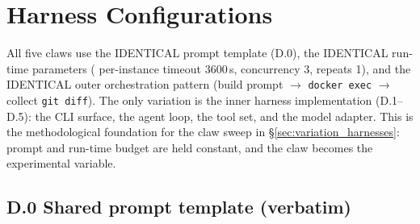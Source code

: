 \section{Harness Configurations}\label{appendix:harness}

All five claws use the IDENTICAL prompt template (D.0), the IDENTICAL run-time parameters ( per-instance timeout 3600\,s, concurrency 3, repeats 1), and the IDENTICAL outer orchestration pattern (build prompt $\rightarrow$ \texttt{docker exec} $\rightarrow$ collect \texttt{git diff}). The only variation is the inner harness implementation (D.1--D.5): the CLI surface, the agent loop, the tool set, and the model adapter. This is the methodological foundation for the claw sweep in \S\ref{sec:variation_harnesses}: prompt and run-time budget are held constant, and the claw becomes the experimental variable.

\subsection*{D.0 Shared prompt template (verbatim)}


